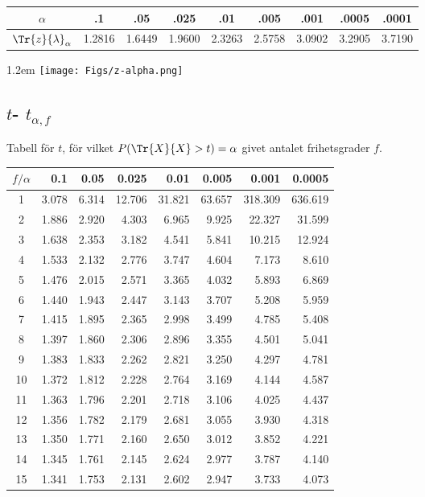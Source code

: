 \documentclass{article}
\def\myskip{\vspace{8pt plus 12pt minus 6pt}}
\begin{document}
{\begin{minipage}[b]{0.69\hsize}
\medskip
\begin{tabular}[h]{c|*{8}{c}}
  $\alpha$ & .1  &  .05  &  .025  &  .01  &  .005  &  .001  &  .0005  &  .0001 \\\hline
  $\Tr{z}{\lambda}_\alpha$ &
  1.2816 & 1.6449 & 1.9600 & 2.3263 & 2.5758 & 3.0902 & 3.2905 & 3.7190 \\
\end{tabular}
\end{minipage}
%
\hfill\lower1.2em
\hbox{\texttt{[image: Figs/z-alpha.png]}}

\myskip

\subsection*{ $t$- $t_{\alpha,f}$}%

   {Tabell för}
   $t$,
      {för vilket}
   $P(\Tr{X}{X} > t)=\alpha$
      {givet antalet frihetsgrader}
   $f$.

\medskip
\begin{tabular}{c|*{7}{r}}
$f / \alpha$
    &   0.1  &  0.05  & 0.025  &  0.01  & 0.005  & 0.001  & 0.0005 \\\hline
  1 &  3.078 &  6.314 & 12.706 & 31.821 & 63.657 &318.309 &636.619 \\
  2 &  1.886 &  2.920 &  4.303 &  6.965 &  9.925 & 22.327 & 31.599 \\
  3 &  1.638 &  2.353 &  3.182 &  4.541 &  5.841 & 10.215 & 12.924 \\
  4 &  1.533 &  2.132 &  2.776 &  3.747 &  4.604 &  7.173 &  8.610 \\
  5 &  1.476 &  2.015 &  2.571 &  3.365 &  4.032 &  5.893 &  6.869 \\
  6 &  1.440 &  1.943 &  2.447 &  3.143 &  3.707 &  5.208 &  5.959 \\
  7 &  1.415 &  1.895 &  2.365 &  2.998 &  3.499 &  4.785 &  5.408 \\
  8 &  1.397 &  1.860 &  2.306 &  2.896 &  3.355 &  4.501 &  5.041 \\
  9 &  1.383 &  1.833 &  2.262 &  2.821 &  3.250 &  4.297 &  4.781 \\
 10 &  1.372 &  1.812 &  2.228 &  2.764 &  3.169 &  4.144 &  4.587 \\
 11 &  1.363 &  1.796 &  2.201 &  2.718 &  3.106 &  4.025 &  4.437 \\
 12 &  1.356 &  1.782 &  2.179 &  2.681 &  3.055 &  3.930 &  4.318 \\
 13 &  1.350 &  1.771 &  2.160 &  2.650 &  3.012 &  3.852 &  4.221 \\
 14 &  1.345 &  1.761 &  2.145 &  2.624 &  2.977 &  3.787 &  4.140 \\
 15 &  1.341 &  1.753 &  2.131 &  2.602 &  2.947 &  3.733 &  4.073 \\
\end{tabular}

}
\end{document}
